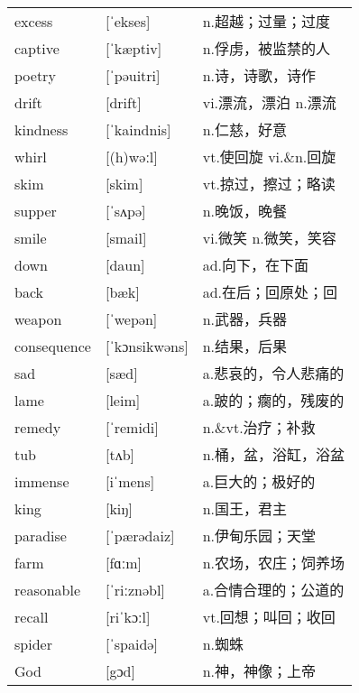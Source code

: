 \documentclass[a4paper]{article}
\begin{document}
\section{}
\begin{tabular}{l l l}

excess & [ˈekses] & n.超越；过量；过度 \\
captive & [ˈkæptiv] & n.俘虏，被监禁的人 \\
poetry & [ˈpəuitri] & n.诗，诗歌，诗作 \\
drift & [drift] & vi.漂流，漂泊 n.漂流 \\
kindness & [ˈkaindnis] & n.仁慈，好意 \\
whirl & [(h)wəːl] & vt.使回旋 vi.\&n.回旋 \\
skim & [skim] & vt.掠过，擦过；略读 \\
supper & [ˈsʌpə] & n.晚饭，晚餐 \\
smile & [smail] & vi.微笑 n.微笑，笑容 \\
down & [daun] & ad.向下，在下面 \\
back & [bæk] & ad.在后；回原处；回 \\
weapon & [ˈwepən] & n.武器，兵器 \\
consequence & [ˈkɔnsikwəns] & n.结果，后果 \\
sad & [sæd] & a.悲哀的，令人悲痛的 \\
lame & [leim] & a.跛的；瘸的，残废的 \\
remedy & [ˈremidi] & n.\&vt.治疗；补救 \\
tub & [tʌb] & n.桶，盆，浴缸，浴盆 \\
immense & [iˈmens] & a.巨大的；极好的 \\
king & [kiŋ] & n.国王，君主 \\
paradise & [ˈpærədaiz] & n.伊甸乐园；天堂 \\
farm & [fɑːm] & n.农场，农庄；饲养场 \\
reasonable & [ˈriːznəbl] & a.合情合理的；公道的 \\
recall & [riˈkɔːl] & vt.回想；叫回；收回 \\
spider & [ˈspaidə] & n.蜘蛛 \\
God & [gɔd] & n.神，神像；上帝 \\

\end{tabular}
\end{document}
